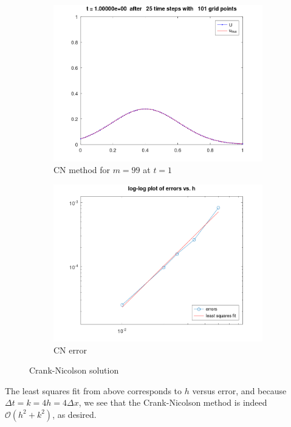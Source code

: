 \begin{solution}
    \begin{figure}[h]
        \centering
        \begin{subfigure}[b]{0.475\textwidth}
            \centering
            \includegraphics[width=\textwidth]{problem_2a_heatCN_t-25.png}
            \caption{CN method for $m = 99$ at $t = 1$}
        \end{subfigure}
        \hfill
        \begin{subfigure}[b]{0.475\textwidth}
            \centering
            \includegraphics[width=\textwidth]{problem_2a_heatCN_error.png}
            \caption{CN error}
        \end{subfigure}
        \caption[]{Crank-Nicolson solution}
    \end{figure}

    The least squares fit from above corresponds to $h$ versus error, and because \linebreak
    $\Delta t = k = 4h = 4 \Delta x$, we see that the Crank-Nicolson method is indeed \linebreak
    $\mathcal{O}\left(h^2 + k^2\right)$, as desired.
    \ \\
\end{solution}